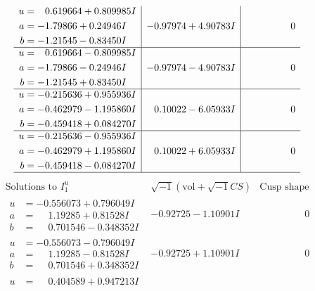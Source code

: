 \documentclass[1p]{elsarticle_modified}
\theoremstyle{definition}
\newcommand{\I}{\sqrt{-1}}
\begin{document}
$$\begin{array}{c|c|c}
\begin{aligned}
u &= \phantom{-}0.619664 + 0.809985 I \\
a &= -1.79866 + 0.24946 I \\
b &= -1.21545 - 0.83450 I\end{aligned}
 & -0.97974 + 4.90783 I & \phantom{-0.000000 } 0 \\ \hline\begin{aligned}
u &= \phantom{-}0.619664 - 0.809985 I \\
a &= -1.79866 - 0.24946 I \\
b &= -1.21545 + 0.83450 I\end{aligned}
 & -0.97974 - 4.90783 I & \phantom{-0.000000 } 0 \\ \hline\begin{aligned}
u &= -0.215636 + 0.955936 I \\
a &= -0.462979 - 1.195860 I \\
b &= -0.459418 + 0.084270 I\end{aligned}
 & \phantom{-}0.10022 - 6.05933 I & \phantom{-0.000000 } 0 \\ \hline\begin{aligned}
u &= -0.215636 - 0.955936 I \\
a &= -0.462979 + 1.195860 I \\
b &= -0.459418 - 0.084270 I\end{aligned}
 & \phantom{-}0.10022 + 6.05933 I & \phantom{-0.000000 } 0\\
 \hline 
 \end{array}$$\newpage$$\begin{array}{c|c|c}  
\text{Solutions to }I^u_{1}& \I (\text{vol} + \sqrt{-1}CS) & \text{Cusp shape}\\
 \hline 
\begin{aligned}
u &= -0.556073 + 0.796049 I \\
a &= \phantom{-}1.19285 + 0.81528 I \\
b &= \phantom{-}0.701546 - 0.348352 I\end{aligned}
 & -0.92725 - 1.10901 I & \phantom{-0.000000 } 0 \\ \hline\begin{aligned}
u &= -0.556073 - 0.796049 I \\
a &= \phantom{-}1.19285 - 0.81528 I \\
b &= \phantom{-}0.701546 + 0.348352 I\end{aligned}
 & -0.92725 + 1.10901 I & \phantom{-0.000000 } 0 \\ \hline\begin{aligned}
u &= \phantom{-}0.404589 + 0.947213 I \\

\end{aligned}
\end{array}$$
\end{document}
